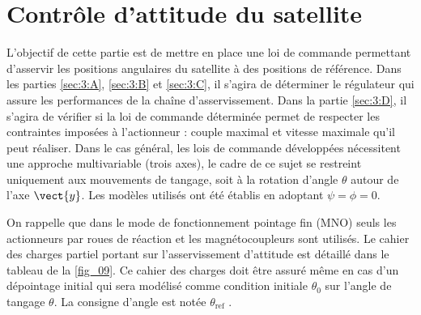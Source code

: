 \section{Contrôle d’attitude du satellite \label{sec:3}} \label{partieIII}
\begin{obj}
L’objectif de cette partie est de mettre en place une loi de commande permettant d’asservir les
positions angulaires du satellite à des positions de référence. Dans les parties \autoref{sec:3:A}, \autoref{sec:3:B} et \autoref{sec:3:C},
il s’agira de déterminer le régulateur qui assure les performances de la chaîne d’asservissement.
Dans la partie \autoref{sec:3:D}, il s’agira de vérifier si la loi de commande déterminée permet de respecter
les contraintes imposées à l’actionneur : couple maximal et vitesse maximale qu’il peut réaliser.
Dans le cas général, les lois de commande développées nécessitent une approche multivariable (trois
axes), le cadre de ce sujet se restreint uniquement aux mouvements de tangage, soit à la rotation
d’angle $\theta$  autour de l’axe $\vect{y}$. Les modèles utilisés ont été établis en adoptant $\psi  =\phi = 0$.
\end{obj}

\ifprof
\else

On rappelle que dans le mode de fonctionnement pointage fin (MNO) seuls les actionneurs par roues de réaction
et les magnétocoupleurs sont utilisés. Le cahier des charges partiel portant sur l’asservissement d’attitude est
détaillé dans le tableau de la \autoref{fig_09}. Ce cahier des charges doit être assuré même en cas d’un dépointage
initial qui sera modélisé comme condition initiale $\theta_0$ sur l’angle de tangage $\theta$. La consigne d’angle est notée $\theta_{\text{ref}}$ .

